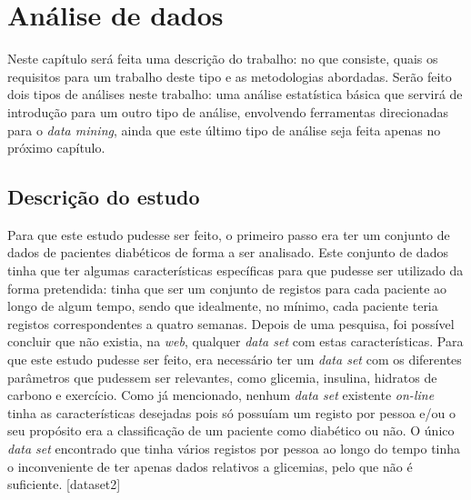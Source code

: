 \chapter{Análise de dados}\label{chap:dese}

Neste capítulo será feita uma descrição do trabalho: no que consiste, quais os requisitos para um trabalho deste tipo e as metodologias abordadas. 
Serão feito dois tipos de análises neste trabalho: uma análise estatística básica que servirá de introdução para um outro tipo de análise, envolvendo ferramentas direcionadas para o \textit{data mining}, ainda que este último tipo de análise seja feita apenas no próximo capítulo.


\section{Descrição do estudo}

Para que este estudo pudesse ser feito, o primeiro passo era ter um conjunto de dados de pacientes diabéticos de forma a ser analisado. Este conjunto de dados tinha que ter algumas características específicas para que pudesse ser utilizado da forma pretendida: tinha que ser um conjunto de registos para cada paciente ao longo de algum tempo, sendo que idealmente, no mínimo, cada paciente teria registos correspondentes a quatro semanas. Depois de uma pesquisa, foi possível concluir que não existia, na \textit{web}, qualquer \textit{data set} com estas características.
Para que este estudo pudesse ser feito, era necessário ter um \textit{data set} com os diferentes parâmetros que pudessem ser relevantes, como glicemia, insulina, hidratos de carbono e exercício. 
Como já mencionado, nenhum \textit{data set} existente \textit{on-line} tinha as características desejadas pois só possuíam um registo por pessoa e/ou o seu propósito era a classificação de um paciente como diabético ou não. O único \textit{data set} encontrado que tinha vários registos por pessoa ao longo do tempo tinha o inconveniente de ter apenas dados relativos a glicemias, pelo que não é suficiente. [dataset2]

